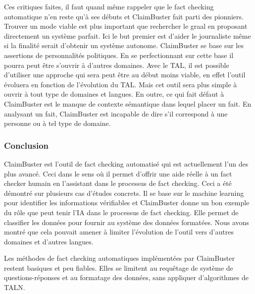 Ces critiques faites, il faut quand même rappeler que le fact checking automatique n'en reste qu'à ses débuts et ClaimBuster fait parti des pionniers. Trouver un mode viable est plus important que rechercher le graal en proposant directement un système parfait. Ici le but premier est d'aider le journaliste même si la finalité serait d'obtenir un système autonome. ClaimBuster se base sur les assertions de personnalités politiques. En se perfectionnant sur cette base il pourra peut être s'ouvrir à d'autres domaines. Avec le TAL, il est possible d'utiliser une approche qui sera peut être au début moins viable, en effet l'outil évoluera en fonction de l'évolution du TAL. Mais cet outil sera plus simple à ouvrir à tout type de domaines et langues. En outre, ce qui fait défaut à ClaimBuster est le manque de contexte sémantique dans lequel placer un fait. En analysant un fait, ClaimBuster est incapable de dire s'il correspond à une personne ou à tel type de domaine.

\subsubsection{Conclusion}

ClaimBuster est l'outil de fact checking automatisé qui est actuellement l'un des plus avancé. Ceci dans le sens où il permet d'offrir une aide réelle à un fact checker humain en l'assistant dans le processus de fact checking. Ceci a été démontré sur plusieurs cas d'études concrets. Il se base sur le machine learning pour identifier les informations vérifiables et ClaimBuster donne un bon exemple du rôle que peut tenir l'IA dans le processus de fact checking. Elle permet de classifier les données pour fournir au système des données formatées. Nous avons montré que cela pouvait amener à limiter l'évolution de l'outil vers d'autres domaines et d'autres langues.

Les méthodes de fact checking automatiques implémentées par ClaimBuster restent basiques et peu fiables. Elles se limitent au requêtage de système de questions-réponses et au formatage des données, sans appliquer d'algorithmes de TALN.

